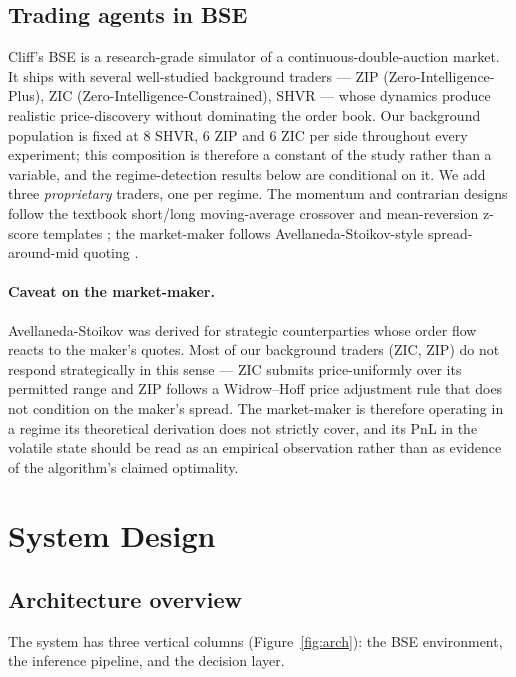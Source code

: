 \documentclass[11pt,a4paper]{article}
\begin{document}
\subsection{Trading agents in BSE}
Cliff's BSE \cite{cliff1997zip,cliff2018bse} is a research-grade simulator of
a continuous-double-auction market. It ships with several well-studied
background traders --- ZIP (Zero-Intelligence-Plus), ZIC
(Zero-Intelligence-Constrained), SHVR --- whose dynamics produce realistic
price-discovery without dominating the order book. Our background population
is fixed at 8 SHVR, 6 ZIP and 6 ZIC per side throughout every experiment;
this composition is therefore a constant of the study rather than a variable,
and the regime-detection results below are conditional on it. We add three
\emph{proprietary} traders, one per regime. The momentum and contrarian
designs follow the textbook short/long moving-average crossover and
mean-reversion z-score templates \cite{chan2013algorithmic}; the
market-maker follows Avellaneda-Stoikov-style spread-around-mid quoting
\cite{avellaneda2008high}.

\paragraph{Caveat on the market-maker.}
Avellaneda-Stoikov was derived for strategic counterparties whose order flow
reacts to the maker's quotes. Most of our background traders (ZIC, ZIP) do
not respond strategically in this sense --- ZIC submits price-uniformly over
its permitted range and ZIP follows a Widrow--Hoff price adjustment rule
that does not condition on the maker's spread. The market-maker is therefore
operating in a regime its theoretical derivation does not strictly cover,
and its PnL in the volatile state should be read as an empirical observation
rather than as evidence of the algorithm's claimed optimality.

\section{System Design}\label{sec:design}

\subsection{Architecture overview}
The system has three vertical columns
(Figure~\ref{fig:arch}): the BSE environment, the inference pipeline, and the
decision layer.
\end{document}
